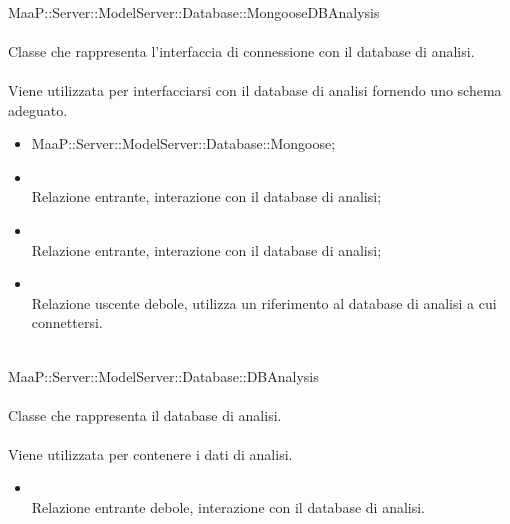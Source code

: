 	\\
	MaaP::Server::ModelServer::Database::MongooseDBAnalysis\\
	\\
	Classe che rappresenta l'interfaccia di connessione con il database di analisi.\\
	\\
	Viene utilizzata per interfacciarsi con il database di analisi fornendo uno schema adeguato.\\
	\begin{itemize}
	\item MaaP::Server::ModelServer::Database::Mongoose;
	\end{itemize}
	\begin{itemize}
	\item{}\\
	Relazione entrante, interazione con il database di analisi;
	\item{}\\
	Relazione entrante, interazione con il database di analisi;
	\item{}\\
	Relazione uscente debole, utilizza un riferimento al database di analisi a cui connettersi.
	\end{itemize}
		
	\\
	MaaP::Server::ModelServer::Database::DBAnalysis\\
	\\
	Classe che rappresenta il database di analisi.\\
	\\
	Viene utilizzata per contenere i dati di analisi.\\
	\begin{itemize}
	\item{}\\
	Relazione entrante debole, interazione con il database di analisi.
	\end{itemize}
		

